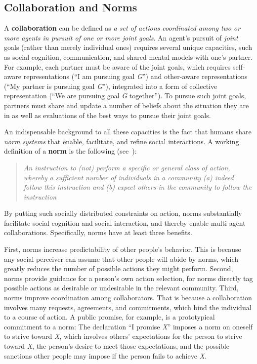 \documentclass[12pt]{article}
\begin{document}
\subsection*{Collaboration and Norms }

\noindent A {\bf collaboration} can be defined as {\em a set of
  actions coordinated among two or more agents in pursuit of one or
  more joint goals}.  An agent's pursuit of {\em joint} goals (rather
than merely individual ones) requires several unique capacities,
such as social cognition, communication, and shared mental models with
one's partner.  For example, each partner must be aware of the joint
goals, which requires self-aware representations (``I am pursuing goal
{\em G}'') and other-aware representations (``My partner is pursuing
goal {\em G}''), integrated into a form of collective representation
(``We are pursuing goal {\em G} together'').  To pursue such joint
goals, partners must share and update a number of beliefs about the
situation they are in as well as evaluations of the best ways to
pursue their joint goals.

An indispensable background to all these capacities is the fact that
humans share {\em norm systems} that enable, facilitate, and refine
social interactions.  A working definition of a
{\bf norm} is the following (see~\citep{bicchieri06}): \vspace{-1mm}

\begin{quote}
  {\em An instruction to (not) perform a specific or general class of
    action, whereby a sufficient number of individuals in a community
    (a) indeed follow this instruction and (b) expect others in the
    community to follow the instruction}
\end{quote}
\label{workdef}

\vspace{-1mm}

By putting such socially distributed constraints on action, norms
substantially facilitate social cognition and social interaction, and
thereby enable multi-agent collaborations.  Specifically, norms have at least three benefits.

First, norms increase predictability of other people's behavior. This
is because any social perceiver can assume that other people will
abide by norms, which greatly reduces the number of possible actions
they might perform.  Second, norms provide guidance for a person's own
action selection, for norms directly tag possible actions as desirable
or undesirable in the relevant community.  Third, norms improve coordination among
collaborators.  That is because a collaboration involves many
requests, agreements, and commitments, which bind the individual to a
course of action.  A public promise, for example, is a prototypical
commitment to a norm: The declaration ``I promise {\em X}'' imposes a
norm on oneself to strive toward {\em X}, which involves others'
expectations for the person to strive toward {\em X}, the person's
desire to meet those expectations, and the possible sanctions other
people may impose if the person fails to achieve {\em X}.
\end{document}
